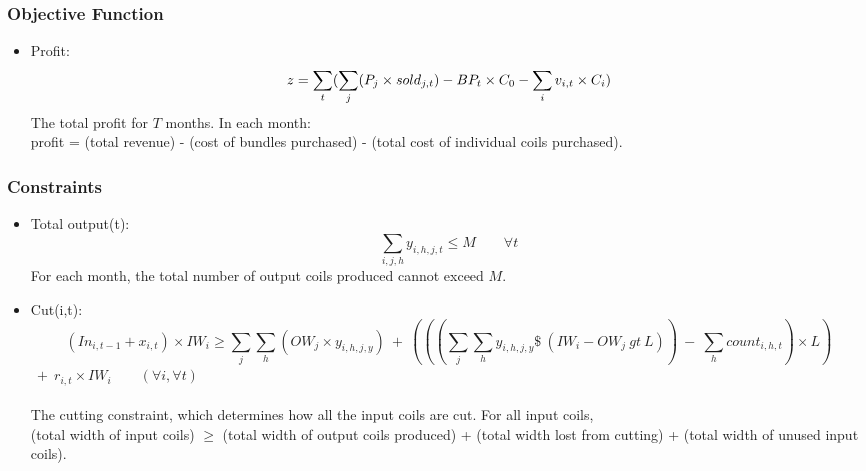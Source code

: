 \documentclass{article}[12pt]
\begin{document}
{\subsubsection{Objective Function}

\begin{itemize}

\item Profit: 
\begin{displaymath}
z = \sum_{t} (\sum_{j} (P_{j}\times sold_{j,t}) - BP_{t}\times C_{0} - \sum_{i} v_{i,t}\times C_{i} )\\
\end{displaymath}
The total profit for $T$ months. In each month: \\ 
profit = (total revenue) - (cost of bundles purchased) - (total cost of individual coils purchased). \\

\end{itemize}

\subsubsection{Constraints}

\begin{itemize}

\item Total output(t): 
\begin{displaymath}
\sum_{i,j,h} y_{i,h,j,t} \leq M \qquad \forall t
\end{displaymath}
For each month, the total number of output coils produced cannot exceed $M$. \\

\item Cut(i,t): 
\begin{displaymath}
  (In_{i,t-1} + x_{i,t})\times IW_{i}\geq \sum_{j}\sum_{h} (OW_{j}\times y_{i,h,j,y})\ +\ (((\sum_{j}\sum_{h} y_{i,h,j,y} \$\ (IW_{i} - OW_{j}\ gt\ L))\ -\ \sum_{h} count_{i,h,t})\times L)
\end{displaymath}
$\ +\ r_{i,t}\times IW_{i} \qquad (\forall i, \forall t)$ \\ \\
The cutting constraint, which determines how all the input coils are cut. For all input coils, \\
(total width of input coils) $\ge$ (total width of output coils produced) + (total width lost from cutting) + (total width of unused input coils). \\
 

\end{itemize}}
\end{document}
